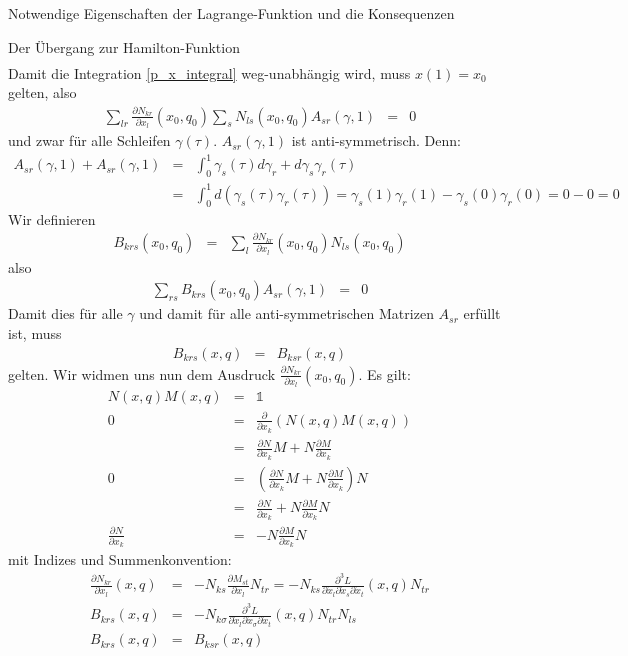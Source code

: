 \begin{chapter}{\titlestr}
\begin{appendix}
\begin{section}{Notwendige Eigenschaften der Lagrange-Funktion und die Konsequenzen}
\begin{subsection}{Der Übergang zur Hamilton-Funktion}
\begin{eqnarray*}
\end{eqnarray*}
Damit die Integration \ref{p_x_integral} weg-unabhängig wird, muss $x(1) = x_0$ gelten, also
\begin{eqnarray*}
\sum_{lr}\frac{\partial N_{kr}}{\partial x_l}(x_0,q_0)\sum_s N_{ls}(x_0,q_0)A_{sr}(\gamma,1) &=& 0
\end{eqnarray*}
und zwar für alle Schleifen $\gamma(\tau)$. $A_{sr}(\gamma,1)$ ist anti-symmetrisch. Denn:
\begin{eqnarray*}
A_{sr}(\gamma,1)+A_{sr}(\gamma,1) &=& \int_0^1 \gamma_s(\tau)d\gamma_r+d\gamma_s\gamma_r(\tau)\\
 &=& \int_0^1 d\left(\gamma_s(\tau)\gamma_r(\tau)\right)=\gamma_s(1)\gamma_r(1)-\gamma_s(0)\gamma_r(0)=0-0 = 0
\end{eqnarray*}
Wir definieren
\begin{eqnarray*}
B_{krs}(x_0,q_0) &=& \sum_{l}\frac{\partial N_{kr}}{\partial x_l}(x_0,q_0) N_{ls}(x_0,q_0)
\end{eqnarray*}
also
\begin{eqnarray*}
\sum_{rs}B_{krs}(x_0,q_0)A_{sr}(\gamma,1) &=& 0
\end{eqnarray*}
Damit dies für alle $\gamma$ und damit für alle anti-symmetrischen Matrizen $A_{sr}$ erfüllt ist, muss
\begin{eqnarray*}
B_{krs}(x,q) &=& B_{ksr}(x,q) 
\end{eqnarray*}
gelten. Wir widmen uns nun dem Ausdruck $\frac{\partial N_{kr}}{\partial x_l}(x_0,q_0)$. Es gilt:
\begin{eqnarray*}
N(x,q)M(x,q) &=& \mathbb{1}\\
0 &=& \frac{\partial}{\partial x_k}\left(N(x,q)M(x,q)\right)\\
&=& \frac{\partial N}{\partial x_k}M+N\frac{\partial M}{\partial x_k}\\
0 &=& \left(\frac{\partial N}{\partial x_k}M+N\frac{\partial M}{\partial x_k}\right)N\\
&=& \frac{\partial N}{\partial x_k}+N\frac{\partial M}{\partial x_k}N\\
\frac{\partial N}{\partial x_k} &=& -N\frac{\partial M}{\partial x_k}N
\end{eqnarray*}
mit Indizes und Summenkonvention:
\begin{eqnarray*}
\frac{\partial N_{kr}}{\partial x_l}(x,q) &=& -N_{ks}\frac{\partial M_{st}}{\partial x_l}N_{tr}=-N_{ks}\frac{\partial^3 L}{\partial \dot{x}_l\partial \dot{x}_s\partial \dot{x}_t}(x,q)N_{tr}\\
B_{krs}(x,q) &=&-N_{k\sigma}\frac{\partial^3 L}{\partial \dot{x}_l\partial \dot{x}_\sigma\partial \dot{x}_t}(x,q)N_{tr}N_{ls}\\
B_{krs}(x,q) &=& B_{ksr}(x,q)
\end{eqnarray*}
\end{subsection}
\end{section}

\ifx\makebook\undefined
	\end{appendix}
	
	
\else
	\end{chapter}
\fi

